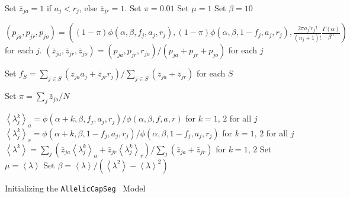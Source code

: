 \documentclass[nofootinbib,amssymb,amsmath]{revtex4}
\newcommand{\ACS}{\texttt{AllelicCapSeg}}
\newcommand{\ave}[1]{\left\langle #1 \right\rangle}
\begin{document}
\begin{algorithm}
\begin{algorithmic}[1]
\State Set $\bar{z}_{ja} = 1$ if $a_j < r_j$, else $\bar{z}_{jr} = 1$.
\State {}
\State Set $\pi = 0.01$
\State Set $\mu = 1$
\State Set $\beta = 10$

\Statex

\Repeat
	\State {}
	\State {}
	\State {}
	\State {}

\Statex

  	\State $(p_{ja}, p_{jr}, p_{jo}) = \left(  (1-\pi)\phi(\alpha, \beta, f_j, a_j, r_j) , (1-\pi)\phi(\alpha, \beta, 1-f_j, a_j, r_j) ,  \frac{2 \pi a_j! r_j!}{(n_j + 1)!} \frac{\Gamma(\alpha)}{\beta^\alpha}  \right)$ for each $j$.
	\State $\left( \bar{z}_{ja}, \bar{z}_{jr}, \bar{z}_{jo} \right) = (p_{ja}, p_{jr}, r_{jo}) / (p_{ja} + p_{jr} + p_{jo}) $ for each $j$
\EndProcedure

\Statex

  	\State Set $f_S = \sum_{j \in S} \left( \bar{z}_{ja} a_j + \bar{z}_{jr} r_j \right) / \sum_{j \in S} \left( \bar{z}_{ja} + \bar{z}_{jr} \right) $ for each $S$
\EndProcedure

\Statex

	\State Set $\pi = \sum_j \bar{z}_{jo} / N$
\EndProcedure

\Statex

	\State $\ave{\lambda^k_j}_a = \phi(\alpha + k, \beta, f_j, a_j, r_j) / \phi(\alpha, \beta, f, a, r)$ for $k = 1, \, 2$ for all $j$
	\State $\ave{\lambda^k_j}_r = \phi(\alpha + k, \beta, 1 - f_j, a_j, r_j) / \phi(\alpha, \beta, 1 - f_j, a_j, r_j)$ for $k = 1, \, 2$ for all $j$
	\State $\ave{\lambda^k} = \sum_j \left( \bar{z}_{ja} \ave{\lambda^k_j}_a +  \bar{z}_{jr} \ave{\lambda^k_j}_r \right) / \sum_j \left( \bar{z}_{ja} +  \bar{z}_{jr} \right)$ for $k = 1, \, 2$
	\State Set $\mu = \ave{\lambda}$
	\State Set $\beta = \ave{\lambda}/ \left(\ave{\lambda^2} - \ave{\lambda}^2 \right)$
\EndProcedure

\end{algorithmic}
\caption{Initializing the \ACS ~ Model}
\label{initialization}
\end{algorithm}
\end{document}

